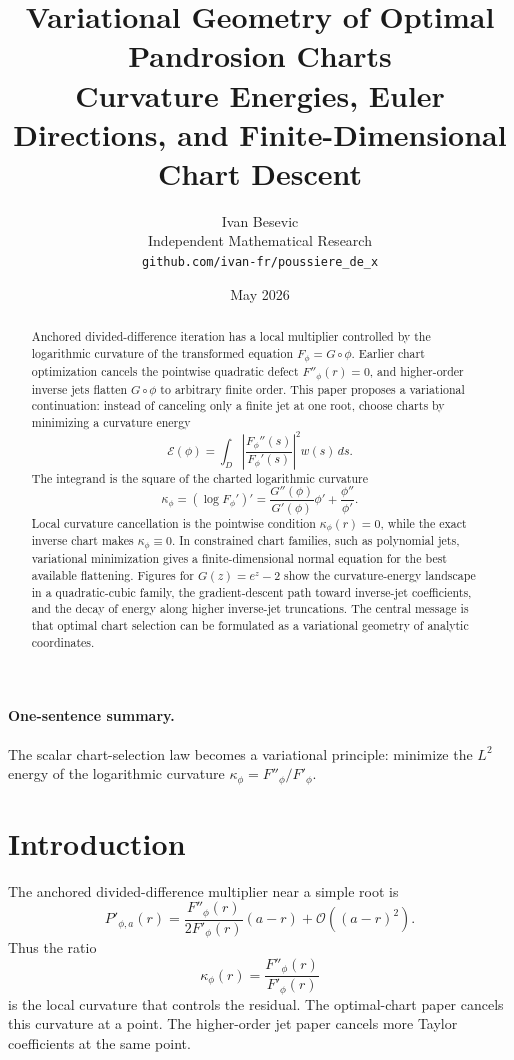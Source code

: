 \documentclass[11pt]{article}
\title{Variational Geometry of Optimal Pandrosion Charts\\
\large Curvature Energies, Euler Directions, and Finite-Dimensional Chart Descent}
\author{Ivan Besevic\\Independent Mathematical Research\\\texttt{github.com/ivan-fr/poussiere\_de\_x}}
\date{May 2026}
\theoremstyle{definition}
\newcommand{\E}{\mathcal E}
\newcommand{\Oterm}{\mathcal O}
\begin{document}
\maketitle

\begin{abstract}
Anchored divided-difference iteration has a local multiplier controlled by the logarithmic curvature of the transformed equation $F_\phi=G\circ\phi$. Earlier chart optimization cancels the pointwise quadratic defect $F''_\phi(r)=0$, and higher-order inverse jets flatten $G\circ\phi$ to arbitrary finite order. This paper proposes a variational continuation: instead of canceling only a finite jet at one root, choose charts by minimizing a curvature energy
\[
\E(\phi)=\int_D \left|\frac{F_\phi''(s)}{F_\phi'(s)}\right|^2w(s)\,ds.
\]
The integrand is the square of the charted logarithmic curvature
\[
\kappa_\phi=(\log F_\phi')'
=\frac{G''(\phi)}{G'(\phi)}\phi'+\frac{\phi''}{\phi'}.
\]
Local curvature cancellation is the pointwise condition $\kappa_\phi(r)=0$, while the exact inverse chart makes $\kappa_\phi\equiv0$. In constrained chart families, such as polynomial jets, variational minimization gives a finite-dimensional normal equation for the best available flattening. Figures for $G(z)=e^z-2$ show the curvature-energy landscape in a quadratic-cubic family, the gradient-descent path toward inverse-jet coefficients, and the decay of energy along higher inverse-jet truncations. The central message is that optimal chart selection can be formulated as a variational geometry of analytic coordinates.
\end{abstract}

\paragraph{One-sentence summary.}
The scalar chart-selection law becomes a variational principle: minimize the $L^2$ energy of the logarithmic curvature $\kappa_\phi=F''_\phi/F'_\phi$.

\section{Introduction}

The anchored divided-difference multiplier near a simple root is
\[
P'_{\phi,a}(r)
=
\frac{F''_\phi(r)}{2F'_\phi(r)}(a-r)+\Oterm((a-r)^2).
\]
Thus the ratio
\[
\kappa_\phi(r)=\frac{F''_\phi(r)}{F'_\phi(r)}
\]
is the local curvature that controls the residual. The optimal-chart paper cancels this curvature at a point. The higher-order jet paper cancels more Taylor coefficients at the same point.
\end{document}
